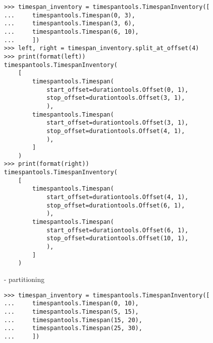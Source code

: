 \begin{singlespacing}
\begin{lstlisting}
>>> timespan_inventory = timespantools.TimespanInventory([
...     timespantools.Timespan(0, 3),
...     timespantools.Timespan(3, 6),
...     timespantools.Timespan(6, 10),
...     ])
>>> left, right = timespan_inventory.split_at_offset(4)
>>> print(format(left))
timespantools.TimespanInventory(
    [
        timespantools.Timespan(
            start_offset=durationtools.Offset(0, 1),
            stop_offset=durationtools.Offset(3, 1),
            ),
        timespantools.Timespan(
            start_offset=durationtools.Offset(3, 1),
            stop_offset=durationtools.Offset(4, 1),
            ),
        ]
    )
>>> print(format(right))
timespantools.TimespanInventory(
    [
        timespantools.Timespan(
            start_offset=durationtools.Offset(4, 1),
            stop_offset=durationtools.Offset(6, 1),
            ),
        timespantools.Timespan(
            start_offset=durationtools.Offset(6, 1),
            stop_offset=durationtools.Offset(10, 1),
            ),
        ]
    )
\end{lstlisting}
\end{singlespacing}

\begin{comment}
Timespan.split_at_offsets()
\end{comment}

- partitioning

\begin{comment}
<abjad>
timespan_inventory = timespantools.TimespanInventory([
    timespantools.Timespan(0, 10),
    timespantools.Timespan(5, 15),
    timespantools.Timespan(15, 20),
    timespantools.Timespan(25, 30),
    ])
</abjad>
\end{comment}

\begin{singlespacing}
\begin{lstlisting}
>>> timespan_inventory = timespantools.TimespanInventory([
...     timespantools.Timespan(0, 10),
...     timespantools.Timespan(5, 15),
...     timespantools.Timespan(15, 20),
...     timespantools.Timespan(25, 30),
...     ])
\end{lstlisting}
\end{singlespacing}

\begin{comment}
<abjad>
for inventory in timespan_inventory.partition():
    print(format(inventory))

</abjad>
\end{comment}

